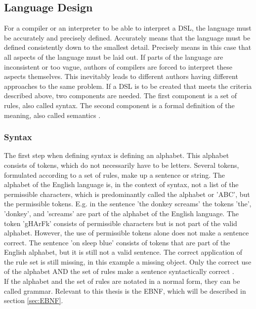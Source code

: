 \subsection{Language Design}\label{sec:design}
For a compiler or an interpreter to be able to interpret a \ac{DSL}, the language must be accurately and precisely defined. Accurately means that the language must be defined consistently down to the smallest detail. Precisely means in this case that all aspects of the language must be laid out. If parts of the language are inconsistent or too vague, authors of compilers are forced to interpret these aspects themselves. This inevitably leads to different authors having different approaches to the same problem. If a \ac{DSL} is to be created that meets the criteria described above, two components are needed. The first component is a set of rules, also called syntax. The second component is a formal definition of the meaning, also called semantics \parencite[cf.][file 2]{farrell_compiler_1995}.
\subsubsection{Syntax}
The first step when defining syntax is defining an alphabet. This alphabet consists of tokens, which do not necessarily have to be letters. Several tokens, formulated according to a set of rules, make up a sentence or string. The alphabet of the English language is, in the context of syntax, not a list of the permissible characters, which is predominantly called the alphabet or 'ABC', but the permissible tokens.
E.g. in the sentence 'the donkey screams' the tokens 'the', 'donkey', and 'screams' are part of the alphabet of the English language. The token 'gHArFk' consists of permissible characters but is not part of the valid alphabet. However, the use of permissible tokens alone does not make a sentence correct. The sentence 'on sleep blue' consists of tokens that are part of the English alphabet, but it is still not a valid sentence. The correct application of the rule set is still missing, in this example a missing object. Only the correct use of the alphabet AND the set of rules make a sentence syntactically correct \parencite[cf.][file 2]{farrell_compiler_1995}.\\
If the alphabet and the set of rules are notated in a normal form, they can be called grammar. Relevant to this thesis is the \ac{EBNF}, which will be described in section \ref{sec:EBNF}.
